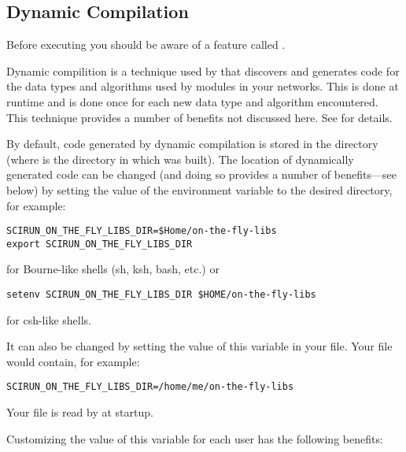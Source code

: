 \subsection{Dynamic Compilation}
\label{sec:dyncomp}

Before executing \sr{} you should be aware of a feature called
.

Dynamic compilition is a technique used by \sr{} that discovers and
generates code for the data types and algorithms used by modules in
your networks.  This is done at runtime and is done once for each new
data type and algorithm encountered.  This technique provides a number
of benefits not discussed here.  See
  for details.

By default, code generated by dynamic compilation is stored in the
directory  (where
 is the directory in which \sr{} was built).  The
location of dynamically generated code can be changed (and doing so
provides a number of benefits---see below) by setting the value of the
environment variable  to the
desired directory, for example:

\begin{verbatim}
SCIRUN_ON_THE_FLY_LIBS_DIR=$Home/on-the-fly-libs
export SCIRUN_ON_THE_FLY_LIBS_DIR
\end{verbatim}

for Bourne-like shells (sh, ksh, bash, etc.) or

\begin{verbatim}
setenv SCIRUN_ON_THE_FLY_LIBS_DIR $HOME/on-the-fly-libs
\end{verbatim}

for csh-like shells.

It can also be changed by setting the value of this variable in
your 
file. Your  file would contain, for example:

\begin{verbatim}
SCIRUN_ON_THE_FLY_LIBS_DIR=/home/me/on-the-fly-libs
\end{verbatim}

Your  file is read by \sr{} at startup.

Customizing the value of this variable for each \sr{} user has
the following benefits:

